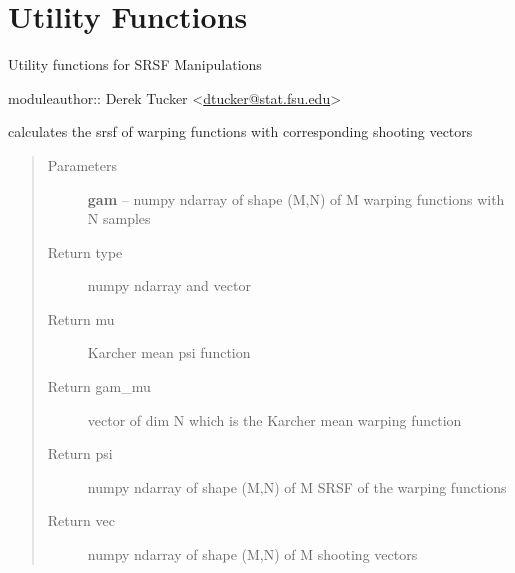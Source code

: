 \documentclass[letterpaper,10pt,english]{sphinxmanual}
\begin{document}
\chapter{Utility Functions}
\label{utility_functions::doc}\label{utility_functions:utility-functions}\label{utility_functions:module-utility_functions}
Utility functions for SRSF Manipulations

moduleauthor:: Derek Tucker \textless{}\href{mailto:dtucker@stat.fsu.edu}{dtucker@stat.fsu.edu}\textgreater{}

\begin{fulllineitems}
\label{utility_functions:utility_functions.SqrtMean}
calculates the srsf of warping functions with corresponding shooting vectors
\begin{quote}\begin{description}
\item[{Parameters}] \leavevmode
\textbf{gam} -- numpy ndarray of shape (M,N) of M warping functions with N samples

\item[{Return type}]  numpy ndarray and vector

\item[{Return mu}] \leavevmode
Karcher mean psi function

\item[{Return gam\_mu}] \leavevmode
vector of dim N which is the Karcher mean warping function

\item[{Return psi}] \leavevmode
numpy ndarray of shape (M,N) of M SRSF of the warping functions

\item[{Return vec}] \leavevmode
numpy ndarray of shape (M,N) of M shooting vectors

\end{description}\end{quote}

\end{fulllineitems}

\end{document}
